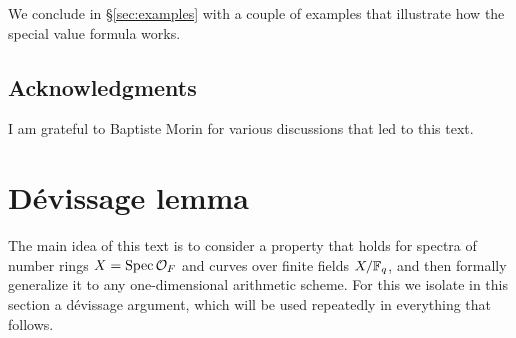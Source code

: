 \documentclass{article}
\numberwithin{equation}{section}
\begin{document}
We conclude in \S\ref{sec:examples} with a couple of examples that illustrate
how the special value formula works.

\subsection*{Acknowledgments}

I am grateful to Baptiste Morin for various discussions that led to this text.


\section{Dévissage lemma}
\label{sec:devissage}

The main idea of this text is to consider a property that holds for spectra of
number rings $X = \operatorname{Spec} \mathcal{O}_F$ and curves over finite fields $X/\mathbb{F}_q$,
and then formally generalize it to any one-dimensional arithmetic scheme.
For this we isolate in this section a dévissage argument, which will be used
repeatedly in everything that follows.
\end{document}
